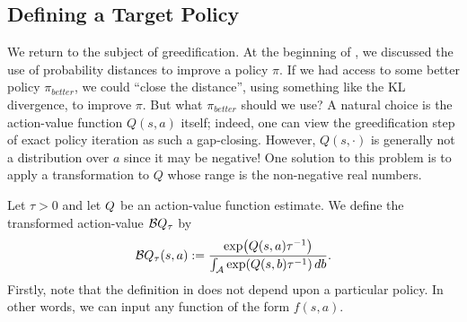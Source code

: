 \documentclass[\main/thesis.tex]{subfiles}
\begin{document}
\subsection{Defining a Target Policy}
We return to the subject of greedification. At the beginning of , we discussed the use of probability distances to improve a policy $\pi$. If we had access to some better policy $\pi_{better}$, we could ``close the distance'', using something like the KL divergence, to improve $\pi$. But what $\pi_{better}$ should we use? A natural choice is the action-value function $Q(s, a)$ itself; indeed, one can view the greedification step of exact policy iteration as such a gap-closing. However, $Q(s, \cdot)$ is generally not a distribution over $a$ since it may be negative! One solution to this problem is to apply a transformation to $Q$ whose range is the non-negative real numbers.

Let $\tau > 0$ and let ${Q}$ be an action-value function estimate. We define the transformed action-value $\mathcal{B}Q_\tau$ by 
\begin{equation}\label{eq:boltzmann-q}
    \mathcal{B}Q_\tau(s, a) := \frac{\exp({Q}(s, a)\tau^{-1})}{\int_{\mathcal{A}} \exp({Q}(s, b)\tau^{-1}) \, db}.
\end{equation}
%
Firstly, note that the definition in  does not depend upon a particular policy. In other words, we can input any function of the form $f(s, a)$. 
\end{document}
